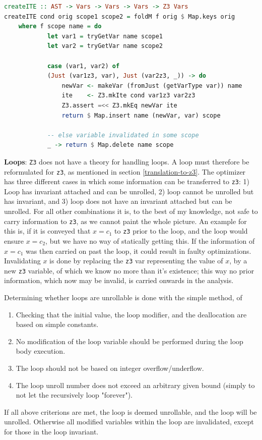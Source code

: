\begin{lstlisting}[language=Haskell, label=listing:ite, caption=Using \lsin{mkIte}.]
createITE :: AST -> Vars -> Vars -> Vars -> Z3 Vars
createITE cond orig scope1 scope2 = foldM f orig $ Map.keys orig
    where f scope name = do
            let var1 = tryGetVar name scope1
            let var2 = tryGetVar name scope2

            case (var1, var2) of
            (Just (var1z3, var), Just (var2z3, _)) -> do
                newVar <- makeVar (fromJust (getVarType var)) name
                ite    <- Z3.mkIte cond var1z3 var2z3
                Z3.assert =<< Z3.mkEq newVar ite
                return $ Map.insert name (newVar, var) scope

            -- else variable invalidated in some scope
            _ -> return $ Map.delete name scope
\end{lstlisting}
\noindent
\textbf{Loops}: \texttt{Z3} does not have a theory for handling loops. A loop must therefore be
reformulated for \texttt{z3}, as mentioned in section \ref{translation-to-z3}. The optimizer
has three different cases in which some information can be transferred to \texttt{z3}: 1)
Loop has invariant attached and can be unrolled, 2) loop cannot be unrolled but has invariant,
and 3) loop does not have an invariant attached but can be unrolled. For all other combinations
it is, to the best of my knowledge, not safe to carry information to \texttt{z3}, as we cannot
paint the whole picture. An example for this is, if it is conveyed that $x = c_1$ to \texttt{z3}
prior to the loop, and the loop would ensure $x=c_2$, but we have no way of statically getting this.
If the information of $x=c_1$ was then carried on past the loop, it could result in faulty
optimizations. Invalidating $x$ is done by replacing the \texttt{z3} var representing the value
of $x$, by a new \texttt{z3} variable, of which we know no more than it's existence; this way
no prior information, which now may be invalid, is carried onwards in the analysis.

Determining whether loops are unrollable is done with the simple method, of 
\begin{enumerate}
    \item Checking that the initial value, the loop modifier, and the deallocation are based on
          simple constants.

    \item No modification of the loop variable should be performed during the loop body execution.

    \item The loop should not be based on integer overflow/underflow.

    \item The loop unroll number does not exceed an arbitrary given bound (simply to not let
          the recursively loop "forever").
\end{enumerate}
\noindent
If all above criterions are met, the loop is deemed unrollable, and the loop will be unrolled.
Otherwise all modified variables within the loop are invalidated, except for those in
the loop invariant.

